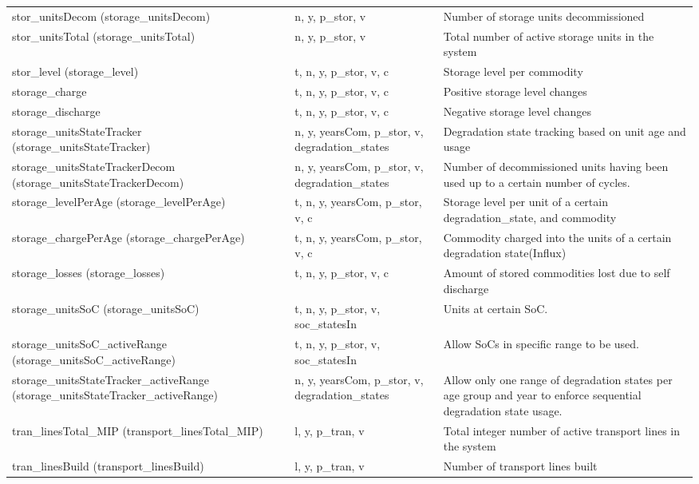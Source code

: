 \documentclass[11pt]{article}
\begin{document}
\begin{tabularx}{\textwidth}{| l | l | X |}
stor\_unitsDecom (storage\_unitsDecom)  & n, y, p\_stor, v & Number of storage units decommissioned \\ 
stor\_unitsTotal (storage\_unitsTotal)  & n, y, p\_stor, v & Total number of active storage units in the system \\ 
stor\_level (storage\_level)  & t, n, y, p\_stor, v, c & Storage level per commodity \\ 
storage\_charge & t, n, y, p\_stor, v, c & Positive storage level changes \\ 
storage\_discharge & t, n, y, p\_stor, v, c & Negative storage level changes \\ 
storage\_unitsStateTracker (storage\_unitsStateTracker)  & n, y, yearsCom, p\_stor, v, degradation\_states & Degradation state tracking based on unit age and usage \\ 
storage\_unitsStateTrackerDecom (storage\_unitsStateTrackerDecom)  & n, y, yearsCom, p\_stor, v, degradation\_states & Number of decommissioned units having been used up to a certain number of cycles. \\ 
storage\_levelPerAge (storage\_levelPerAge)  & t, n, y, yearsCom, p\_stor, v, c & Storage level per unit of a certain degradation\_state, and commodity \\ 
storage\_chargePerAge (storage\_chargePerAge)  & t, n, y, yearsCom, p\_stor, v, c & Commodity charged into the units of a certain degradation state(Influx) \\ 
storage\_losses (storage\_losses)  & t, n, y, p\_stor, v, c & Amount of stored commodities lost due to self discharge \\ 
storage\_unitsSoC (storage\_unitsSoC)  & t, n, y, p\_stor, v, soc\_statesIn & Units at certain SoC. \\ 
storage\_unitsSoC\_activeRange (storage\_unitsSoC\_activeRange)  & t, n, y, p\_stor, v, soc\_statesIn & Allow SoCs in specific range to be used. \\ 
storage\_unitsStateTracker\_activeRange (storage\_unitsStateTracker\_activeRange)  & n, y, yearsCom, p\_stor, v, degradation\_states & Allow only one range of degradation states per age group and year to enforce sequential degradation state usage. \\ 
tran\_linesTotal\_MIP (transport\_linesTotal\_MIP)  & l, y, p\_tran, v & Total integer number of active transport lines in the system \\ 
tran\_linesBuild (transport\_linesBuild)  & l, y, p\_tran, v & Number of transport lines built \\ 

\end{tabularx}
\end{document}
